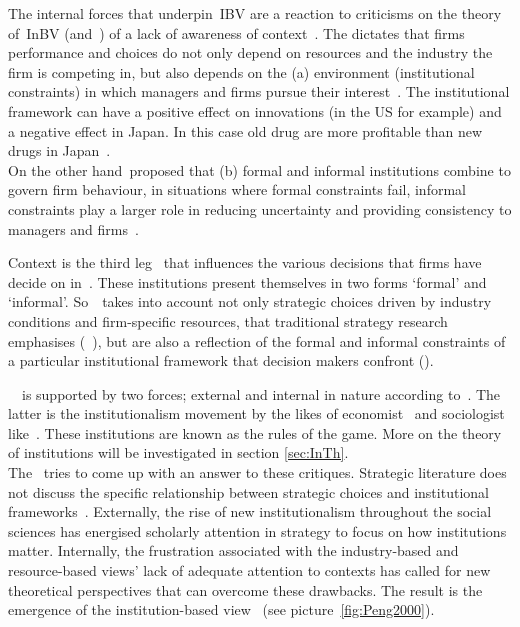 The internal forces that underpin~\gls{IBV} are a reaction to criticisms on the theory of~\gls{InBV} (and~\rbv) of a lack of awareness of context~\cite{Narayanan:2005}.  
The \ibv dictates that firms performance and choices do not only depend on resources and the industry the firm is competing in, but also depends on the (a) environment (institutional constraints) in which managers and firms pursue their interest~\cite{Peng:2008b}.%
The institutional framework can have a positive effect on innovations (in the US for example) and a negative effect in Japan. 
In this case old drug are more profitable than new drugs in Japan~\cite{Peng:2008b}. \\
On the other hand~\ibv proposed that (b) formal and informal institutions combine to govern firm behaviour, in situations where formal constraints fail, informal constraints play a larger role in reducing uncertainty and providing consistency to managers and firms~\cite{Peng:2008b}. 





Context is the third leg~\cite{Peng:2009} that influences the various decisions that firms have decide on in~\ib. 
These institutions present themselves in two forms `formal' and `informal'. 
So~\ibv~takes into account not only strategic choices driven by industry conditions and firm-specific resources, that traditional strategy research emphasises (~\cite{Porter:1980,Barney:1991}), but are also a reflection of the formal and informal constraints of a particular institutional framework that decision makers confront (\cite{Oliver:1997,Scott:1995}). 

~\ibv~is supported by two forces; external and internal in nature according to~\cite{Peng:2009}. 
The latter is the institutionalism movement by the likes of economist~\cite{North:1990} and sociologist like~\cite{DiMaggio:1983,Scott:1995}. 
These institutions are known as the rules of the game.
More on the theory of institutions will be investigated in section \ref{sec:InTh}.\\



The \ibv~tries to come up with an answer to these critiques. 
Strategic literature does not discuss the specific relationship between strategic choices and institutional frameworks~\cite{Peng:2008}.
Externally, the rise of new institutionalism throughout the social sciences has energised scholarly attention in strategy to focus on how institutions matter. 
Internally, the frustration associated with the industry-based and resource-based views’ lack of adequate attention to contexts has called for new theoretical perspectives that can overcome these drawbacks. 
The result is the emergence of the institution-based view~\cite{Peng:2009} (see picture~\ref{fig:Peng2000}).

